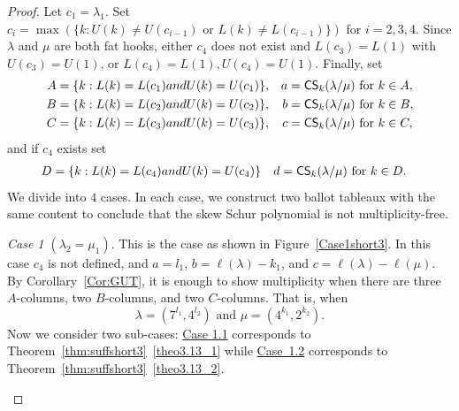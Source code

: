 \documentclass[10pt]{article}
\theoremstyle{definition}
\newcommand{\CS	}{\mathsf{CS}}
\let\hypertargeta\hypertarget %
\let\hyperlinka\hyperlink %
\newenvironment{Case}[1]{\par\vskip2pt\noindent%
\emph{#1}.}{\vskip2pt}
\begin{document}
\begin{proof}
Let $c_1 = \lambda_1$. Set $c_i = \max(\{k : U(k) \neq U(c_{i-1})\text{ or }L(k) \neq L(c_{i-1})\})$ for $i=2,3,4$. Since $\lambda$ and $\mu$ are both fat hooks, either $c_4$ does not exist and $L(c_3)=L(1)$ with $U(c_3)=U(1)$, or $L(c_4)=L(1),U(c_4)=U(1)$. Finally, set
\begin{align*}
A & = \{ k : L(k) = L(c_1)\emph{ and }U(k) = U(c_1) \}, & a & = \CS _k(\lambda / \mu)\text{ for }k \in A, \\
B & = \{ k : L(k) = L(c_2)\emph{ and }U(k) = U(c_2) \}, & b & = \CS _k(\lambda / \mu)\text{ for }k \in B, \\
C & = \{ k : L(k) = L(c_3)\emph{ and }U(k) = U(c_3) \}, & c & = \CS _k(\lambda / \mu)\text{ for }k \in C,
\end{align*}
and if $c_4$ exists set
\begin{align*}
D & = \{ k : L(k) = L(c_4)\emph{ and }U(k) = U(c_4) \} & d & = \CS _k(\lambda / \mu)\text{ for }k \in D.
\end{align*}
We divide into $4$ cases. In each case, we construct two ballot tableaux with the same content to conclude that the skew Schur polynomial is not multiplicity-free.

\begin{Case}
{\hypertargeta{theo3.13_case1}{Case 1} $(\lambda_2 = \mu_1)$} This is the case as shown in Figure~\ref{Case1short3}. In this case $c_4$ is not defined, and $a = l_1$, $b = \ell(\lambda)-k_1$, and $c = \ell(\lambda)-\ell(\mu)$. By Corollary~\ref{Cor:GUT}, it is enough to show multiplicity when there are three $A$-columns, two $B$-columns, and two $C$-columns. That is, when 
\[
\lambda = (7^{l_1}, 4^{l_2})\text{ and }\mu=(4^{k_1},2^{k_2}).
\] 
Now we consider two sub-cases: \hyperlinka{theo3.13_case1.1}{Case 1.1} corresponds to Theorem~\ref{thm:suffshort3}~\ref{theo3.13_1} while \hyperlinka{theo3.13_case1.2}{Case~1.2} corresponds to Theorem~\ref{thm:suffshort3}~\ref{theo3.13_2}.

\begin{figure}[htb]\centering
\end{figure}
\end{Case}
\end{proof}
\end{document}
